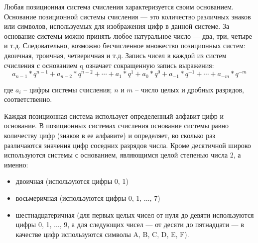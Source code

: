\documentclass[a4paper]{article}
\begin{document}
Любая позиционная система счисления характеризуется своим основанием. Основание позиционной системы счисления — это количество различных знаков или символов, используемых для изображения цифр в данной системе. За основание системы можно принять любое натуральное число — два, три, четыре и т.д. Следовательно, возможно бесчисленное множество позиционных систем: двоичная, троичная, четверичная и т.д. Запись чисел в каждой из систем счисления с основанием q означает сокращенную запись выражения:
\begin{equation}
  a_{n-1} * q^{n-1} + a_{n-2}* q^{n-2} + \cdots + a_{1}* q^{1} + a_{0}*q^{0} + a_{-1}*q^{-1} + \cdots + a_{-m} * q^{-m}
\end{equation}
\begin{center}
  где $a_{i}$ – цифры системы счисления; $n$ и $m$ – число целых и дробных разрядов, соответственно.
\end{center}
Каждая позиционная система использует определенный алфавит цифр и основание. В позиционных системах счисления основание системы равно количеству цифр (знаков в ее алфавите) и определяет, во сколько раз различаются значения цифр соседних разрядов числа.
Кроме десятичной широко используются системы с основанием, являющимся целой степенью числа 2, а именно:
\begin{itemize}
  \item двоичная (используются цифры 0, 1)
  \item восьмеричная (используются цифры 0, 1, $\ldots$, 7)
  \item шестнадцатеричная (для первых целых чисел от нуля до девяти используются цифры 0, 1, $\ldots$, 9, а для следующих чисел --- от десяти до пятнадцати --- в качестве цифр используются символы A, B, C, D, E, F).
\end{itemize}
\end{document}
